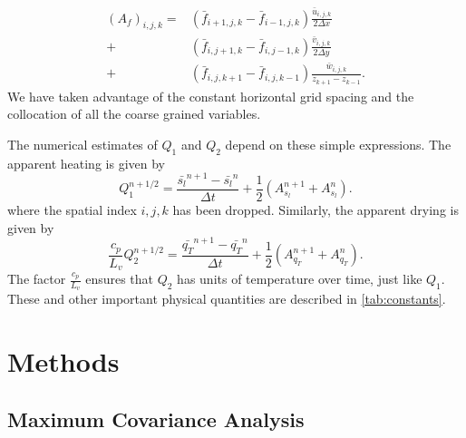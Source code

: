 \documentclass{report}
\begin{document}

\begin{align}
  (A_f)_{i,j,k} = &\left( \bar{f}_{i+1,j,k} - \bar{f}_{i-1,j,k} \right) \frac{\bar{u}_{i,j,k}}{2 \Delta x}\\
              +&\left( \bar{f}_{i,j+1,k} - \bar{f}_{i,j-1,k} \right) \frac{\bar{v}_{i,j,k}}{2 \Delta y}\nonumber\\
              +& \left(  \bar{f}_{i,j,k+1} - \bar{f}_{i,j,k-1} \right) \frac{\bar{w}_{i,j,k}}{z_{k+1} - z_{k-1}}.\nonumber
\end{align}
We have taken advantage of the constant horizontal grid spacing and the
collocation of all the coarse grained variables.

The numerical estimates of $Q_1$ and $Q_2$ depend on these simple expressions.
The apparent heating is given by
\begin{equation}
  \label{eq:q1-num}
  Q_1^{n+1/2} = \frac{\bar{s_l}^{n+1} - \bar{s_l}^{n} }{\Delta t}
            + \frac{1}{2} \left( A^{n+1}_{s_l}  + A^{n}_{s_l} \right).
\end{equation}
where the spatial index $i,j,k$ has been dropped. Similarly, the apparent
drying is given by
\begin{equation}
  \label{eq:q2-num}
  \frac{c_p}{L_v} Q_2^{n+1/2} = \frac{\bar{q_T}^{n+1} - \bar{q_T}^{n} }{\Delta t}
            + \frac{1}{2} \left( A^{n+1}_{q_T}  + A^{n}_{q_T} \right).
\end{equation}
The factor $\frac{c_p}{L_v}$ ensures that $Q_2$ has units of temperature over
time, just like $Q_1$. These and other important physical quantities are
described in \autoref{tab:constants}.


\chapter{Methods}

\section{Maximum Covariance Analysis}
\label{sec:mca}


\printbibliography

\appendix
\end{document}
